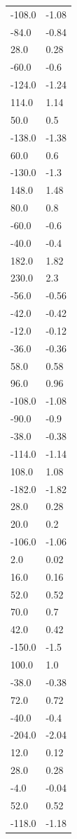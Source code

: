 \begin{longtable}{ll}
-108.0 & -1.08 \\
-84.0 & -0.84 \\
28.0 & 0.28 \\
-60.0 & -0.6 \\
-124.0 & -1.24 \\
114.0 & 1.14 \\
50.0 & 0.5 \\
-138.0 & -1.38 \\
60.0 & 0.6 \\
-130.0 & -1.3 \\
148.0 & 1.48 \\
80.0 & 0.8 \\
-60.0 & -0.6 \\
-40.0 & -0.4 \\
182.0 & 1.82 \\
230.0 & 2.3 \\
-56.0 & -0.56 \\
-42.0 & -0.42 \\
-12.0 & -0.12 \\
-36.0 & -0.36 \\
58.0 & 0.58 \\
96.0 & 0.96 \\
-108.0 & -1.08 \\
-90.0 & -0.9 \\
-38.0 & -0.38 \\
-114.0 & -1.14 \\
108.0 & 1.08 \\
-182.0 & -1.82 \\
28.0 & 0.28 \\
20.0 & 0.2 \\
-106.0 & -1.06 \\
2.0 & 0.02 \\
16.0 & 0.16 \\
52.0 & 0.52 \\
70.0 & 0.7 \\
42.0 & 0.42 \\
-150.0 & -1.5 \\
100.0 & 1.0 \\
-38.0 & -0.38 \\
72.0 & 0.72 \\
-40.0 & -0.4 \\
-204.0 & -2.04 \\
12.0 & 0.12 \\
28.0 & 0.28 \\
-4.0 & -0.04 \\
52.0 & 0.52 \\
-118.0 & -1.18 \\

\end{longtable}
